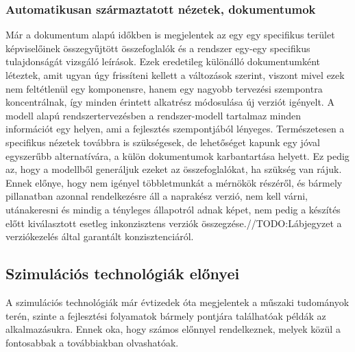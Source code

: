         \subsubsection{Automatikusan származtatott nézetek, dokumentumok}
        Már a dokumentum alapú időkben is megjelentek az egy egy specifikus terület képviselőinek összegyűjtött összefoglalók és a rendszer egy-egy specifikus tulajdonságát vizsgáló leírások.
        Ezek eredetileg különálló dokumentumként léteztek, amit ugyan úgy frissíteni kellett a változások szerint, viszont mivel ezek nem feltétlenül egy komponensre, hanem egy nagyobb tervezési szempontra koncentrálnak, így minden érintett alkatrész módosulása új verziót igényelt.
        A modell alapú rendszertervezésben a rendszer-modell tartalmaz minden információt egy helyen, ami a fejlesztés szempontjából lényeges.
        Természetesen a specifikus nézetek továbbra is szükségesek, de lehetőséget kapunk egy jóval egyszerűbb alternatívára, a külön dokumentumok karbantartása helyett.
        Ez pedig az, hogy a modellből generáljuk ezeket az összefoglalókat, ha szükség van rájuk. Ennek előnye, hogy nem igényel többletmunkát a mérnökök részéről, és bármely pillanatban azonnal rendelkezésre áll a naprakész verzió, nem kell várni, utánakeresni és mindig a tényleges állapotról adnak képet, nem pedig a készítés előtt kiválasztott esetleg inkonzisztens verziók összegzése.//TODO:Lábjegyzet a verziókezelés által garantált konzisztenciáról.

    \subsection{Szimulációs technológiák előnyei}
    A szimulációs technológiák már évtizedek óta megjelentek a műszaki tudományok terén, szinte a fejlesztési folyamatok bármely pontjára találhatóak példák az alkalmazásukra.
    Ennek oka, hogy számos előnnyel rendelkeznek, melyek közül a fontosabbak a továbbiakban olvashatóak.

